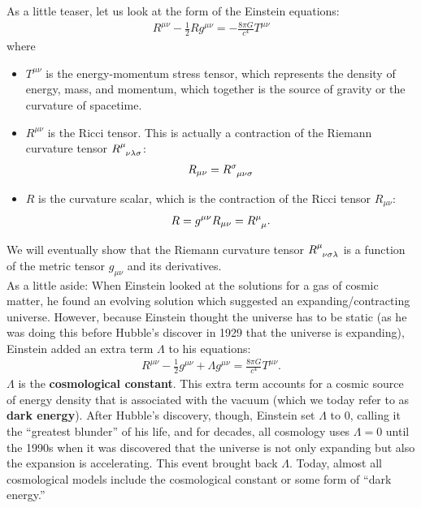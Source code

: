 \documentclass{article}
\theoremstyle{definition}
\begin{document}
As a little teaser, let us look at the form of the Einstein equations:
\begin{align*}
\boxed{R^{\mu\nu} - \frac{1}{2}Rg^{\mu\nu} = -\frac{8\pi G}{c^4}T^{\mu\nu}}
\end{align*}
where \begin{itemize}
	\item $T^{\mu\nu}$ is the energy-momentum stress tensor, which represents the density of energy, mass, and momentum, which together is the source of gravity or the curvature of spacetime. 
	\item $R^{\mu\nu}$ is the Ricci tensor. This is actually a contraction of the Riemann curvature tensor $\tensor{R}{^\mu_{\nu\lambda\sigma}}$:
	\begin{align*}
	R_{\mu\nu} = \tensor{R}{^\sigma_{\mu\nu\sigma}}
	\end{align*}
	\item $R$ is the curvature scalar, which is the contraction of the Ricci tensor $R_{\mu\nu}$:
	\begin{align*}
	R = g^{\mu\nu}R_{\mu\nu} = \tensor{R}{^\mu_\mu}.
	\end{align*}
\end{itemize}
We will eventually show that the Riemann curvature tensor $
\tensor{R}{^{\mu}_{\nu\sigma\lambda}}$ is a function of the metric tensor $g_{\mu\nu}$ and its derivatives.\\

As a little aside: When Einstein looked at the solutions for a gas of cosmic matter, he found an evolving solution which suggested an expanding/contracting universe. However, because Einstein thought the universe has to be static (as he was doing this before Hubble's discover in 1929 that the universe is expanding), Einstein added an extra term $\Lambda$ to his equations:
\begin{align*}
R^{\mu\nu} - \frac{1}{2}g^{\mu\nu} + \Lambda g^{\mu\nu} = \frac{8\pi G}{c^4}T^{\mu\nu}.
\end{align*}
$\Lambda$ is the \textbf{cosmological constant}. This extra term accounts for a cosmic source of energy density that is associated with the vacuum (which we today refer to as \textbf{dark energy}). After Hubble's discovery, though, Einstein set $\Lambda$ to 0, calling it the ``greatest blunder'' of his life, and for decades, all cosmology uses $\Lambda = 0$ until the 1990s when it was discovered that the universe is not only expanding but also the expansion is accelerating. This event brought back $\Lambda$. Today, almost all cosmological models include the cosmological constant or some form of ``dark energy.''\\
\end{document}
